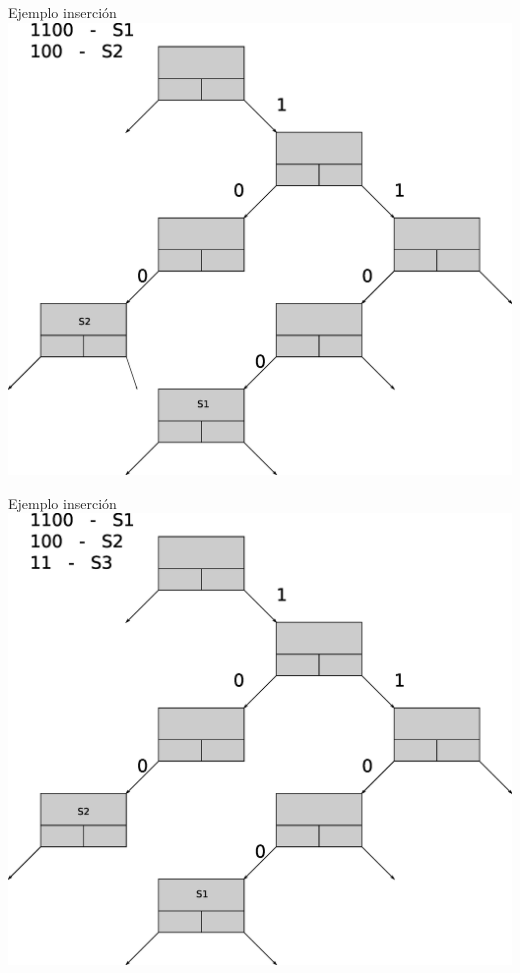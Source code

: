 \documentclass[xcolor=dvipsnames]{beamer}
\begin{document}
\begin{frame}{Ejemplo inserción} 
\center	
\includegraphics[scale=0.30]{figures/lluinsert07.eps} 
\end{frame}

\begin{frame}{Ejemplo inserción} 
\center	
\includegraphics[scale=0.30]{figures/lluinsert08.eps} 
\end{frame}
\end{document}
